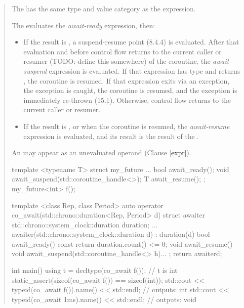 \begin{quote}
\pnum The  has the same type and value category as the  expression.

\pnum The  evaluates the \textit{await-ready} expression, then:
\begin{itemize}
  \item If the result is , a suspend-resume point (8.4.4) is evaluated. After that evaluation and before control flow returns to the current caller or resumer (TODO: define this somewhere) of the coroutine, the \textit{await-suspend} expression is evaluated. If that expression has type  and returns , the coroutine is resumed. If that expression exits via an exception, the exception is caught, the coroutine is resumed, and the exception is immediately re-thrown (15.1). Otherwise, control flow returns to the current caller or resumer.
  \item If the result is , or when the coroutine is resumed, the \textit{await-resume} expression is evaluated, and its result is the result of the .
  
\end{itemize}

\pnum
\enternote
An  may appear as an unevaluated operand (Clause \ref{expr}). 
\enterexample
\begin{codeblock}	
template <typename T>
struct my_future {
  ...
  bool await_ready();
  void await_suspend(std::coroutine_handle<>);
  T await_resume();
};
my_future<int> f();
  
template <class Rep, class Period>
auto operator co_await(std::chrono::duration<Rep, Period> d) {
  struct awaiter {
    std::chrono::system_clock::duration duration;
    ...
    awaiter(std::chrono::system_clock::duration d) : duration(d){}
    bool await_ready() const { return duration.count() <= 0; }
    void await_resume() {}
    void await_suspend(std::coroutine_handle<> h){...}
  };
  return awaiter{d};
}

int main() {
  using t = decltype(co_await f()); // t is int
  static_assert(sizeof(co_await f()) == sizeof(int));
  std::cout << typeid(co_await f()).name() << std::endl; // outputs: int
  std::cout << typeid(co_await 1ms).name() << std::endl; // outputs: void
}
\end{codeblock}
\exitexample%
\exitnote

\end{quote}
